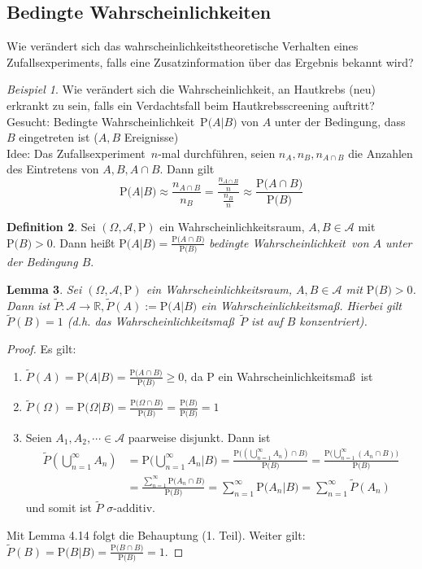 \documentclass[a4paper,12pt,fleqn]{scrartcl}
\newcommand{\R}{\mathbb{R}}
\newcommand{\m}[1]{\mathcal{ #1 }}
\newcommand{\p}[1]{\text{P(} #1 \text{)}}
\newcommand{\ZE}{Zufallsexperiment}
\newcommand{\WR}{Wahrscheinlichkeitsraum}
\newcommand{\WM}{Wahrscheinlichkeitsmaß}
\newcommand{\Wk}{Wahrscheinlichkeit}
\theoremstyle{definition}
\newtheorem{definition}{Definition}[section]
\theoremstyle{plain}
\newtheorem{lemma}[definition]{Lemma}
\theoremstyle{remark}
\newtheorem{beispiel}[definition]{Beispiel}
\begin{document}
\subsection{Bedingte Wahrscheinlichkeiten}
Wie verändert sich das wahrscheinlichkeitstheoretische Verhalten eines \ZE s, falls eine Zusatzinformation über das Ergebnis bekannt wird?
\begin{beispiel}
Wie verändert sich die \Wk, an Hautkrebs (neu) erkrankt zu sein, falls ein Verdachtsfall beim Hautkrebsscreening auftritt? \\
Gesucht: Bedingte \Wk \, $\p{A | B}$ von $A$ unter der Bedingung, dass $B$ eingetreten ist ($A, B$ Ereignisse)\\
Idee: Das \ZE \, $n$-mal durchführen, seien $n_A, n_B, n_{A \cap B}$ die Anzahlen des Eintretens von $A, B, A \cap B$. Dann gilt
\[\p{A | B} \approx \frac{n_{A \cap B}}{n_B} = \frac{\frac{n_{A \cap B}}{n}}{\frac{n_B}{n}} \approx \frac{\p{A \cap B}}{\p{B}}\]
\end{beispiel}
\begin{definition}
Sei $(\Omega, \m{A}, \text{P})$ ein \WR, $A,B \in \m{A}$ mit $\p{B} > 0$. Dann heißt $\p{A | B} = \frac{\p{A \cap B}}{\p{B}}$ \emph{bedingte \Wk \, von $A$ unter der Bedingung $B$}.
\end{definition}
\begin{lemma}
Sei $(\Omega, \m{A}, \text{P})$ ein \WR, $A,B \in \m{A}$ mit $\p{B} > 0$. Dann ist $\tilde{P}: \m{A} \rightarrow \R, \tilde{P}(A) := \p{A | B}$ ein \WM. Hierbei gilt $\tilde{P}(B)=1$ (d.h. das \WM \, $\tilde{P}$ ist auf $B$ konzentriert).
\end{lemma}
\begin{proof}
Es gilt:
\begin{enumerate}[(1)]
\item $\tilde{P}(A) = \p{A | B} = \frac{\p{A \cap B}}{\p{B}} \geq 0$, da P ein \WM \, ist
\item $\tilde{P}(\Omega) = \p{\Omega | B} = \frac{\p{\Omega \cap B}}{\p{B}} = \frac{\p{B}}{\p{B}} = 1$
\item Seien $A_1, A_2, \cdots \in \m{A}$ paarweise disjunkt. Dann ist
\begin{align*}
\tilde{P}(\bigcup_{n=1}^\infty A_n) &= \p{\bigcup_{n=1}^\infty A_n | B} = \frac{\p{(\bigcup_{n=1}^\infty A_n) \cap B}}{\p{B}} = \frac{\p{\bigcup_{n=1}^\infty (A_n \cap B)}}{\p{B}} \\
&= \frac{\sum_{n=1}^\infty \p{A_n \cap B}}{\p{B}} = \sum_{n=1}^\infty \p{A_n | B} = \sum_{n=1}^\infty \tilde{P}(A_n)
\end{align*}
und somit ist $\tilde{P}$ $\sigma$-additiv.
\end{enumerate}
Mit Lemma 4.14 folgt die Behauptung (1. Teil). Weiter gilt: $\tilde{P}(B) = \p{B | B} = \frac{\p{B \cap B}}{\p{B}} = 1$.
\end{proof}
\end{document}
